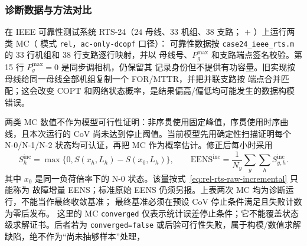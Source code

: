 \subsubsection{诊断数据与方法对比}
在 IEEE 可靠性测试系统 RTS-24（$24$ 母线、$33$ 机组、$38$ 支路；
$+$ ）上运行两类 MC（
模式 \texttt{rel}，\texttt{ac-only-dcopf} 口径）：
可靠性数据按 \texttt{case24\_ieee\_rts.m} 的 33 行机组和 38 行支路逐行映射，并以
母线号、$P_g^{\max}$ 和支路端点签名校验。第 15 行 $P_g^{\max}=0$ 是同步调相机，仍保留其
记录身份但不提供有功容量。旧实现按母线给同一母线全部机组复制一个 FOR/MTTR，并把并联支路按
端点合并匹配；这会改变 COPT 和网络状态概率，是结果偏高/偏低均可能发生的数据构模错误。
\begin{center}
\end{center}
两类 MC 数值不作为模型可行性证明：非序贯使用固定峰值，序贯使用时序曲线，且本次运行的 CoV
尚未达到停止阈值。当前模型先用确定性扫描证明每个 N-0/N-1/N-2 状态均可认证，再把 MC
作为概率估计。修正后每小时采用
\begin{equation}
 S^{\mathrm{inc}}_{h}=\max\{0,S(x_h,L_h)-S(x_0,L_h)\},\qquad
 \mathrm{EENS}^{\mathrm{inc}}=\frac1{N_y}\sum_y\sum_h S^{\mathrm{inc}}_{y,h}.
\end{equation}
其中 $x_0$ 是同一负荷倍率下的 N-0 状态。该量按式~\eqref{eq:rel-rts-raw-incremental} 只能称为
故障增量 EENS；标准原始 EENS 仍须另报。上表两次 MC 均为诊断运行，不能当作最终收敛基准；
最终基准必须在预设 CoV 停止条件满足且失败计数为零后发布。
这里的 MC \texttt{converged} 仅表示统计误差停止条件；它不能覆盖状态级求解证书。后者若为
\texttt{converged=false} 或后验可行性失败，属于构模/数值求解缺陷，绝不作为“尚未抽够样本”处理，
